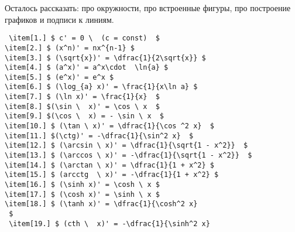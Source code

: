\documentclass[12pt,4paper]{report}
\begin{document}
\vspace{10cm}

Осталось рассказать: про окружности, про встроенные фигуры, про построение графиков и подписи к линиям.

\newpage


\vspace{10cm}
\newpage



 \begin{verbatim}
 \item[1.] $ c' = 0 \  (c = const)  $
\item[2.] $ (x^n)' = nx^{n-1} $
\item[3.] $ (\sqrt{x})' = \dfrac{1}{2\sqrt{x}} $
\item[4.] $ (a^x)' = a^x\cdot  \ln{a} $
\item[5.] $ (e^x)' = e^x $
\item[6.] $ (\log_{a} x)' = \frac{1}{x\ln a} $
\item[7.] $ (\ln x)' = \frac{1}{x}  $ 
\item[8.] $(\sin \  x)' = \cos \ x  $ 
\item[9.] $(\cos \  x) = - \sin \ x  $ 
\item[10.] $ (\tan \ x)' = \dfrac{1}{\cos ^2 x}  $
\item[11.] $(\ctg)' = -\dfrac{1}{\sin^2 x}  $
\item[12.] $ (\arcsin \ x)' = \dfrac{1}{\sqrt{1 - x^2}}  $ 
\item[13.] $ (\arccos \ x)' = -\dfrac{1}{\sqrt{1 - x^2}}  $ 
\item[14.] $ (\arctan \ x)' = \dfrac{1}{1 + x^2} $
\item[15.] $ (arcctg  \ x)' = -\dfrac{1}{1 + x^2} $
\item[16.] $ (\sinh x)' = \cosh \ x $
\item[17.] $ (\cosh x)' = \sinh \ x $
\item[18.] $ (\tanh x)' = \dfrac{1}{\cosh^2 x}
 $
 \item[19.] $ (cth \  x)' = -\dfrac{1}{\sinh^2 x}
 \end{verbatim}
\end{document}
